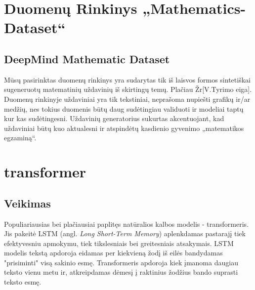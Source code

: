 \documentclass[conference]{IEEEtran}
\begin{document}
\section{Duomenų Rinkinys „Mathematics-Dataset“}

\subsection{DeepMind Mathematic Dataset}

Mūsų pasirinktas duomenų rinkinys yra sudarytas tik iš laisvos formos sintetiškai sugeneruotų matematinių uždavinių iš skirtingų temų. Plačiau Žr[V.Tyrimo eiga]. Duomenų rinkinyje uždaviniai yra tik tekstiniai, neprašoma nupiešti grafikų ir/ar medžių, nes tokius duomenis būtų daug sudėtingiau validuoti ir modeliai taptų kur kas sudėtingesni. Uždavinių generatorius sukurtas akcentuojant, kad uždaviniai būtų kuo aktualesni ir atspindėtų kasdienio gyvenimo „matematikos egzaminą“.






\section{transformer}

\subsection{Veikimas}
Populiariausias bei plačiausiai paplitęs natūralios kalbos modelis - transformeris. Jis pakeitė LSTM (angl. \textit{Long Short-Term Memory}) aplenkdamas pastarajį tiek efektyvesniu apmokymu, tiek tikslesniais bei greitesniais atsakymais. LSTM modelis tekstą apdoroja eidamas per kiekvieną žodį iš eilės bandydamas "prisiminti" visą sakinio esmę. Transformeris apdoroja kiek įmanoma daugiau teksto vienu metu ir, atkreipdamas dėmesį į raktinius žodžius bando suprasti teksto esmę.
\end{document}
